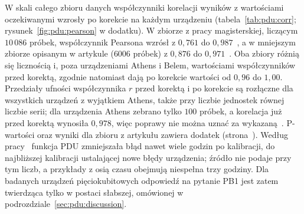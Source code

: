 
W skali całego zbioru danych współczynniki korelacji wyników z wartościami oczekiwanymi wzrosły po korekcie na każdym urządzeniu (tabela~\ref{tab:pdu:corr}; rysunek~\ref{fig:pdu:pearson} w dodatku).
W zbiorze z pracy magisterskiej, liczącym $10\,086$ próbek, współczynnik Pearsona wzrósł z $0{,}761$ do $0{,}987$~\cite{werner_magisterka_2022}, a w mniejszym zbiorze opisanym w artykule ($6006$ próbek) z $0{,}876$ do $0{,}971$~\cite{werner_experiment_driven_2022}.
Oba zbiory różnią się licznością i, poza urządzeniami Athens i Belem, wartościami współczynników przed korektą, zgodnie natomiast dają po korekcie wartości od $0{,}96$ do $1{,}00$.
Przedziały ufności współczynnika $r$ przed korektą i po korekcie są rozłączne dla wszystkich urządzeń z wyjątkiem Athens, także przy liczbie jednostek równej liczbie serii; dla urządzenia Athens zebrano tylko $100$ próbek, a korelacja już przed korektą wynosiła $0{,}978$, więc poprawy nie można uznać za wykazaną~\cite{werner_magisterka_2022}.
P-wartości oraz wyniki dla zbioru z artykułu zawiera dodatek (strona~\pageref{tab:pdu:app:pvalues}).
Według pracy~\cite{werner_magisterka_2022} funkcja PDU zmniejszała błąd nawet wiele godzin po kalibracji, do najbliższej kalibracji ustalającej nowe błędy urządzenia; źródło nie podaje przy tym liczb, a przykłady z osią czasu obejmują niespełna trzy godziny.
Dla badanych urządzeń pięciokubitowych odpowiedź na pytanie PB1 jest zatem twierdząca tylko w postaci słabszej, omówionej w podrozdziale~\ref{sec:pdu:discussion}.

